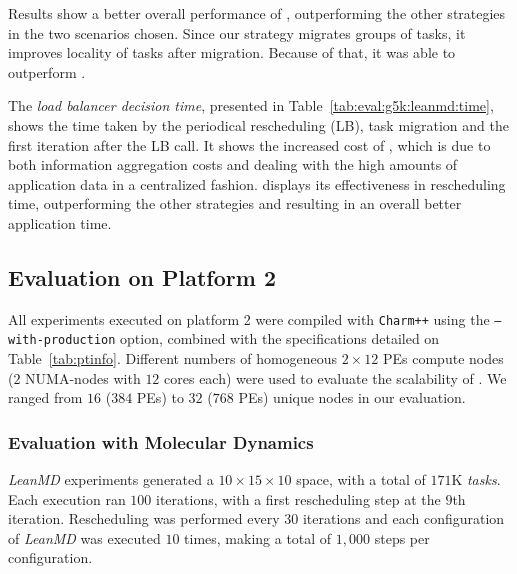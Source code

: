 Results show a better overall performance of \packdrop, outperforming the other strategies in the two scenarios chosen.
Since our strategy migrates groups of tasks, it improves locality of tasks after migration. Because of that, it was able to outperform \distributedlb.

The \textit{load balancer decision time}, presented in Table~\ref{tab:eval:g5k:leanmd:time}, shows the time taken by the periodical rescheduling (LB), task migration and the first iteration after the LB call.
It shows the increased cost of , which is due to both information aggregation costs and dealing with the high amounts of application data in a centralized fashion.
\packdrop displays its effectiveness in rescheduling time, outperforming the other strategies and resulting in an overall better application time. 

\subsection{Evaluation on Platform 2} \label{sec:sdumont}

All experiments executed on platform 2 were compiled with \texttt{Charm++} using the \texttt{--with-production} option, combined with the specifications detailed on Table~\ref{tab:ptinfo}.
Different numbers of homogeneous $2\times 12$ PEs compute nodes ($2$ NUMA-nodes with $12$ cores each) were used to evaluate the scalability of \packdrop.
We ranged from $16$ ($384$ PEs) to $32$ ($768$ PEs) unique nodes in our evaluation. 

\subsubsection{Evaluation with Molecular Dynamics} \label{sec:sdumont:md}

\textit{LeanMD} experiments generated a $10\times15\times10$ space, with a total of $171$K \textit{tasks}.
Each execution ran $100$ iterations, with a first rescheduling step at the $9$th iteration. 
Rescheduling was performed every $30$ iterations and each configuration of \textit{LeanMD} was executed $10$ times, making a total of $1,000$ steps per configuration. 

%	

